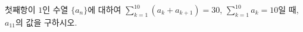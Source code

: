 첫째항이 $1$인 수열 $\{a_n\}$에 대하여 $\displaystyle\sum_{k=1}^{10}(a_k+a_{k+1})=30$, $\displaystyle\sum_{k=1}^{10}a_k=10$일 때, $a_{11}$의 값을 구하시오.
